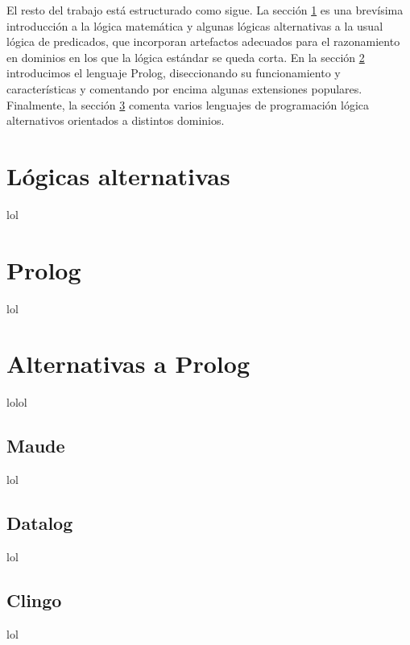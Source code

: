 \documentclass[11pt,captions=nooneline,DIV=14, parskip=full]{scrartcl}
\begin{document}
El resto del trabajo está estructurado como sigue. La sección \ref{sec:alt-logic} es una brevísima introducción a la lógica matemática y algunas lógicas alternativas a la usual lógica de predicados, que incorporan artefactos adecuados para el razonamiento en dominios en los que la lógica estándar se queda corta. En la sección \ref{sec:prolog} introducimos el lenguaje Prolog, diseccionando su funcionamiento y características y comentando por encima algunas extensiones populares. Finalmente, la sección \ref{sec:alt-prolog} comenta varios lenguajes de programación lógica alternativos orientados a distintos dominios.

\section{Lógicas alternativas}
\label{sec:alt-logic}
lol

\section{Prolog}
\label{sec:prolog}
lol

\section{Alternativas a Prolog}
\label{sec:alt-prolog}
lolol

\subsection{Maude}
lol

\subsection{Datalog}
lol

\subsection{Clingo}
lol
\end{document}
